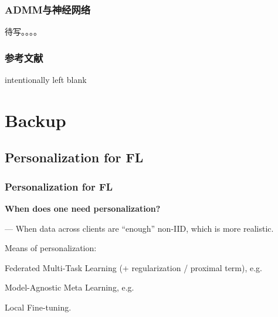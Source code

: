 
\begin{frame}
\frametitle{ADMM与神经网络}

待写。。。。

\end{frame}




\begin{frame}[allowframebreaks]
\frametitle{参考文献}

{\footnotesize


}

\end{frame}


\begin{frame}

{\tiny intentionally left blank}

\end{frame}


\section[Backup]{Backup}

\subsection[PerFL]{Personalization for FL}


\begin{frame}
\frametitle{Personalization for FL}

{\bfseries When does one need personalization?}

\vspace{0.2em}
\noindent --- When data across clients are ``enough'' non-IID, which is more realistic.

\pause
\vspace{0.8em}

Means of personalization:
\begin{itemize}
    \item Federated Multi-Task Learning (+ regularization / proximal term), e.g. \cite{smith2017mocha}
    {
    \item Model-Agnostic Meta Learning, e.g. \cite{finn2017maml}
    \item Local Fine-tuning.}
\end{itemize}

\end{frame}

